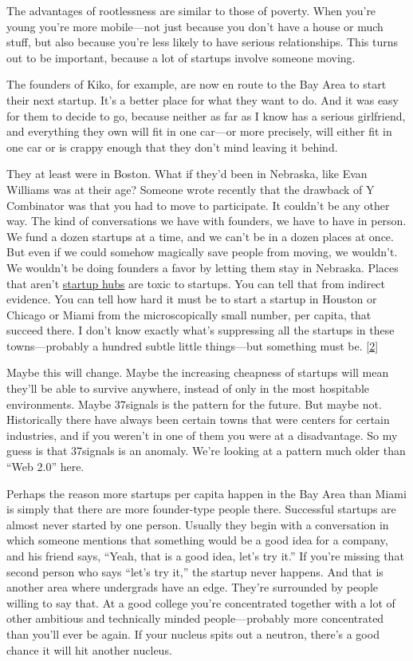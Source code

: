 The advantages of rootlessness are similar to those of poverty. When
you're young you're more mobile---not just because you don't have a
house or much stuff, but also because you're less likely to have serious
relationships. This turns out to be important, because a lot of startups
involve someone moving.

The founders of Kiko, for example, are now en route to the Bay Area to
start their next startup. It's a better place for what they want to do.
And it was easy for them to decide to go, because neither as far as I
know has a serious girlfriend, and everything they own will fit in one
car---or more precisely, will either fit in one car or is crappy enough
that they don't mind leaving it behind.

They at least were in Boston. What if they'd been in Nebraska, like Evan
Williams was at their age? Someone wrote recently that the drawback of Y
Combinator was that you had to move to participate. It couldn't be any
other way. The kind of conversations we have with founders, we have to
have in person. We fund a dozen startups at a time, and we can't be in a
dozen places at once. But even if we could somehow magically save people
from moving, we wouldn't. We wouldn't be doing founders a favor by
letting them stay in Nebraska. Places that aren't
\href{siliconvalley.html}{startup hubs} are toxic to startups. You can
tell that from indirect evidence. You can tell how hard it must be to
start a startup in Houston or Chicago or Miami from the microscopically
small number, per capita, that succeed there. I don't know exactly
what's suppressing all the startups in these towns---probably a hundred
subtle little things---but something must be. {[}\hyperref[f2n]{2}{]}

Maybe this will change. Maybe the increasing cheapness of startups will
mean they'll be able to survive anywhere, instead of only in the most
hospitable environments. Maybe 37signals is the pattern for the future.
But maybe not. Historically there have always been certain towns that
were centers for certain industries, and if you weren't in one of them
you were at a disadvantage. So my guess is that 37signals is an anomaly.
We're looking at a pattern much older than ``Web 2.0'' here.

Perhaps the reason more startups per capita happen in the Bay Area than
Miami is simply that there are more founder-type people there.
Successful startups are almost never started by one person. Usually they
begin with a conversation in which someone mentions that something would
be a good idea for a company, and his friend says, ``Yeah, that is a
good idea, let's try it.'' If you're missing that second person who says
``let's try it,'' the startup never happens. And that is another area
where undergrads have an edge. They're surrounded by people willing to
say that. At a good college you're concentrated together with a lot of
other ambitious and technically minded people---probably more
concentrated than you'll ever be again. If your nucleus spits out a
neutron, there's a good chance it will hit another nucleus.

